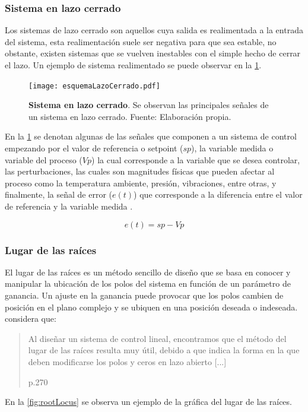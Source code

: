         \subsubsection{Sistema en lazo cerrado}
		
			Los sistemas de lazo cerrado son aquellos cuya salida es realimentada a la entrada del sistema, esta realimentación suele ser negativa para que sea estable, no obstante, existen sistemas que se vuelven inestables con el simple hecho de cerrar el lazo. Un ejemplo de sistema realimentado se puede observar en la \cref{fig:esquemaLazoCerrado}.
			
			\begin{figure}[htb]
				\centering
				\texttt{[image: esquemaLazoCerrado.pdf]}
				\caption[Ejemplo de un sistema en lazo cerrado]{\textbf{Sistema en lazo cerrado}. Se observan las principales señales de un sistema en lazo cerrado. Fuente: Elaboración propia.} 
				\label{fig:esquemaLazoCerrado}
			\end{figure}
			
            En la \cref{fig:esquemaLazoCerrado} se denotan algunas de las señales que componen a un sistema de control empezando por el valor de referencia o setpoint ($sp$), la variable medida o variable del proceso ($Vp$) la cual corresponde a la variable que se desea controlar, las perturbaciones, las cuales son magnitudes físicas que pueden afectar al proceso como la temperatura ambiente, presión, vibraciones, entre otras, y finalmente, la señal de error ($e(t)$) que corresponde a la diferencia entre el valor de referencia y la variable medida \Parencite{maloney2006electronica}.
            
            \begin{equation}\label{eq:Serror}
				e(t) = sp - Vp
            \end{equation}
        
        \subsubsection{Lugar de las raíces}
            
            El lugar de las raíces es un método sencillo de diseño que se basa en conocer y manipular la ubicación de los polos del sistema en función de un parámetro de ganancia. Un ajuste en la ganancia puede provocar que los polos cambien de posición en el plano complejo y se ubiquen en una posición deseada o indeseada. \textcite{ogata2003ingenieria} considera que: \blockquote[p.270]{Al diseñar un sistema de control lineal, encontramos que el método del lugar de las raíces resulta muy útil, debido a que indica la forma en la que deben modificarse los polos y ceros en lazo abierto [...]}. En la \cref{fig:rootLocus} se observa un ejemplo de la gráfica del lugar de las raíces.

